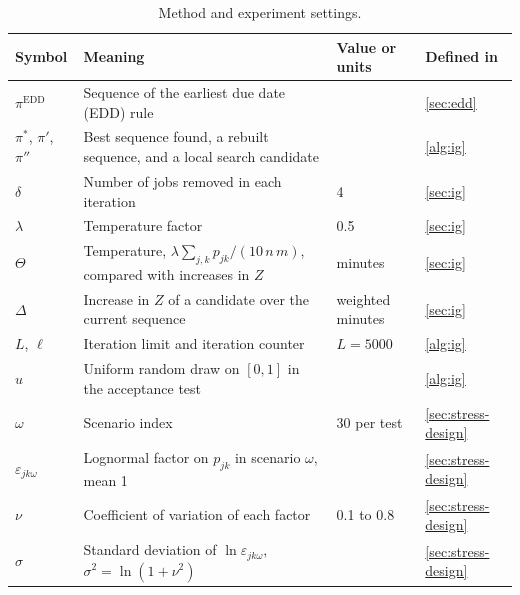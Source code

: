 \begin{table}[!htbp]
\centering
\caption{Method and experiment settings.}
\label{tab:notation-method}
\small
\begin{tabularx}{\textwidth}{lLll}
\toprule
Symbol & Meaning & Value or units & Defined in \\
\midrule
$\pi^{\mathrm{EDD}}$ & Sequence of the earliest due date (EDD) rule & & \cref{sec:edd} \\
$\pi^{*}$, $\pi'$, $\pi''$ & Best sequence found, a rebuilt sequence, and a local search candidate & & \cref{alg:ig} \\
$\delta$ & Number of jobs removed in each iteration & 4 & \cref{sec:ig} \\
$\lambda$ & Temperature factor & 0.5 & \cref{sec:ig} \\
$\Theta$ & Temperature, $\lambda \sum_{j,k} p_{jk} / (10\, n\, m)$, compared with increases in $Z$ & minutes & \cref{sec:ig} \\
$\Delta$ & Increase in $Z$ of a candidate over the current sequence & weighted minutes & \cref{sec:ig} \\
$L$, $\ell$ & Iteration limit and iteration counter & $L = 5000$ & \cref{alg:ig} \\
$u$ & Uniform random draw on $[0, 1]$ in the acceptance test & & \cref{alg:ig} \\
$\omega$ & Scenario index & 30 per test & \cref{sec:stress-design} \\
$\varepsilon_{jk\omega}$ & Lognormal factor on $p_{jk}$ in scenario $\omega$, mean 1 & & \cref{sec:stress-design} \\
$\nu$ & Coefficient of variation of each factor & 0.1 to 0.8 & \cref{sec:stress-design} \\
$\sigma$ & Standard deviation of $\ln \varepsilon_{jk\omega}$, $\sigma^2 = \ln(1 + \nu^2)$ & & \cref{sec:stress-design} \\
\bottomrule
\end{tabularx}
\end{table}
